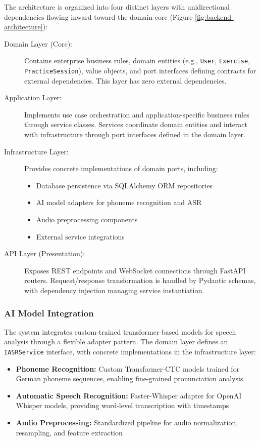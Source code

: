 The architecture is organized into four distinct layers with unidirectional dependencies flowing inward toward the domain core (Figure \ref{fig:backend-architecture}):

\begin{description}
    \item[Domain Layer (Core):] Contains enterprise business rules, domain entities (e.g., \texttt{User}, \texttt{Exercise}, \texttt{PracticeSession}), value objects, and port interfaces defining contracts for external dependencies. This layer has zero external dependencies.
    
    \item[Application Layer:] Implements use case orchestration and application-specific business rules through service classes. Services coordinate domain entities and interact with infrastructure through port interfaces defined in the domain layer.
    
    \item[Infrastructure Layer:] Provides concrete implementations of domain ports, including:
    \begin{itemize}
        \item Database persistence via SQLAlchemy ORM repositories
        \item AI model adapters for phoneme recognition and ASR
        \item Audio preprocessing components
        \item External service integrations
    \end{itemize}
    
    \item[API Layer (Presentation):] Exposes REST endpoints and WebSocket connections through FastAPI routers. Request/response transformation is handled by Pydantic schemas, with dependency injection managing service instantiation.
\end{description}

\subsubsection{AI Model Integration}

The system integrates custom-trained transformer-based models for speech analysis through a flexible adapter pattern. The domain layer defines an \texttt{IASRService} interface, with concrete implementations in the infrastructure layer:

\begin{itemize}
    \item \textbf{Phoneme Recognition:} Custom Transformer-CTC models trained for German phoneme sequences, enabling fine-grained pronunciation analysis
    \item \textbf{Automatic Speech Recognition:} Faster-Whisper adapter for OpenAI Whisper models, providing word-level transcription with timestamps
    \item \textbf{Audio Preprocessing:} Standardized pipeline for audio normalization, resampling, and feature extraction
\end{itemize}

